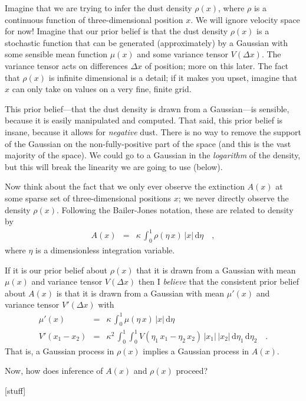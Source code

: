 \documentclass[12pt, letterpaper]{article}
\newcommand{\dd}{\mathrm{d}}
\begin{document}
Imagine that we are trying to infer the dust density $\rho(x)$, where
$\rho$ is a continuous function of three-dimensional position $x$.
We will ignore velocity space for now!
Imagine that our prior belief is that the dust density $\rho(x)$ is a
stochastic function that can be generated (approximately) by a
Gaussian with some sensible mean function $\mu(x)$ and some variance
tensor $V(\Delta x)$.
The variance tensor acts on differences $\Delta x$ of position; more
on this later.
The fact that $\rho(x)$ is infinite dimensional is a detail; if it
makes you upset, imagine that $x$ can only take on values on a very
fine, finite grid.

This prior belief---that the dust density is drawn from a
Gaussian---is sensible, because it is easily manipulated and computed.
That said, this prior belief is insane, because it allows for
\emph{negative} dust.
There is no way to remove the support of the Gaussian on the
non-fully-positive part of the space (and this is the vast majority of
the space).
We could go to a Gaussian in the \emph{logarithm} of the density, but
this will break the linearity we are going to use (below).

Now think about the fact that we only ever observe the extinction
$A(x)$ at some sparse set of three-dimensional positions $x$; we never
directly observe the density $\rho(x)$.
Following the Bailer-Jones notation, these are related to density by
\begin{eqnarray}
A(x) &=& \kappa\,\int_0^1 \rho(\eta\,x)\,|x|\,\dd\eta
\quad,
\end{eqnarray}
where $\eta$ is a dimensionless integration variable.

If it is our prior belief about $\rho(x)$ that it is drawn from a
Gaussian with mean $\mu(x)$ and variance tensor $V(\Delta x)$ then I
\emph{believe} that the consistent prior belief about $A(x)$ is that
it is drawn from a Gaussian with mean $\mu'(x)$ and variance tensor
$V'(\Delta x)$ with
\begin{eqnarray}
\mu'(x) &=& \kappa\,\int_0^1 \mu(\eta\,x)\,|x|\,\dd\eta
\\
V'(x_1 - x_2) &=& \kappa^2\,\int_0^1\int_0^1 V(\eta_1\,x_1 - \eta_2\,x_2)\,|x_1|\,|x_2|\,\dd\eta_1\,\dd\eta_2
\quad .
\end{eqnarray}
That is, a Gaussian process in $\rho(x)$ implies a Gaussian process in
$A(x)$.

Now, how does inference of $A(x)$ and $\rho(x)$ proceed?

[stuff]
\end{document}
